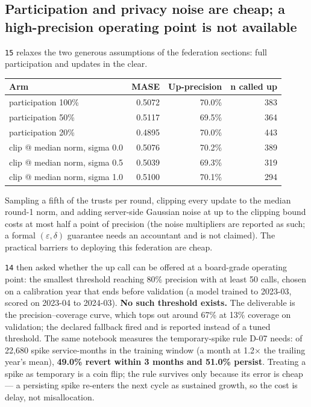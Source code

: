 \documentclass[11pt,a4paper]{article}
\begin{document}
\subsection{Participation and privacy noise are cheap; a high-precision operating point is not
available}

\texttt{15} relaxes the two generous assumptions of the federation sections: full participation
and updates in the clear.

\begin{center}
\begin{tabular}{@{}lrrr@{}}
\toprule
\textbf{Arm} & \textbf{MASE} & \textbf{Up-precision} & \textbf{n called up} \\
\midrule
participation 100\% & 0.5072 & 70.0\% & 383 \\
participation 50\% & 0.5117 & 69.5\% & 364 \\
participation 20\% & 0.4895 & 70.0\% & 443 \\
clip @ median norm, sigma 0.0 & 0.5076 & 70.2\% & 389 \\
clip @ median norm, sigma 0.5 & 0.5039 & 69.3\% & 319 \\
clip @ median norm, sigma 1.0 & 0.5100 & 70.1\% & 294 \\
\bottomrule
\end{tabular}
\end{center}

Sampling a fifth of the trusts per round, clipping every update to the median round-1 norm, and
adding server-side Gaussian noise at up to the clipping bound costs at most half a point of
precision (the noise multipliers are reported as such; a formal $(\varepsilon,\delta)$ guarantee
needs an accountant and is not claimed). The practical barriers to deploying this federation are
cheap.

\texttt{14} then asked whether the up call can be offered at a board-grade operating point: the
smallest threshold reaching 80\% precision with at least 50 calls, chosen on a calibration year
that ends before validation (a model trained to 2023-03, scored on 2023-04 to 2024-03). \textbf{No
such threshold exists.} The deliverable is the precision--coverage curve, which tops out around
67\% at 13\% coverage on validation; the declared fallback fired and is reported instead of a
tuned threshold. The same notebook measures the temporary-spike rule D-07 needs: of 22{,}680
spike service-months in the training window (a month at 1.2$\times$ the trailing year's mean),
\textbf{49.0\% revert within 3 months and 51.0\% persist}. Treating a spike as temporary is a coin
flip; the rule survives only because its error is cheap --- a persisting spike re-enters the next
cycle as sustained growth, so the cost is delay, not misallocation.
\end{document}
